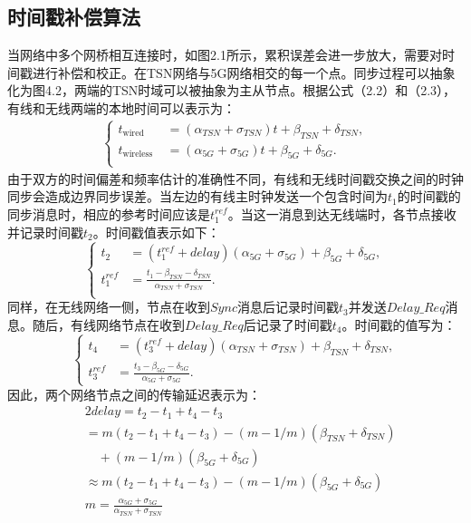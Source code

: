 \documentclass[UTF8,a4paper,12pt]{ctexart}
\numberwithin{equation}{section}
\begin{document}
	\subsection{时间戳补偿算法}
	当网络中多个网桥相互连接时，如图2.1所示，累积误差会进一步放大，需要对时间戳进行补偿和校正。在TSN网络与5G网络相交的每一个点。同步过程可以抽象化为图4.2，两端的TSN时域可以被抽象为主从节点。根据公式（2.2）和（2.3），有线和无线两端的本地时间可以表示为：
	\begin{eqnarray}
		\left\{
		\begin{aligned}
			t_{\text {wired}}&=\left(\alpha_{TSN}+\sigma_{TSN}\right) t+\beta_{TSN}+\delta_{TSN},\\
			t_{\text {wireless }}&=\left(\alpha_{5G}+\sigma_{5G}\right) t+\beta_{5G}+\delta_{5G}.\\
		\end{aligned}
		\right.
	\end{eqnarray}
	由于双方的时间偏差和频率估计的准确性不同，有线和无线时间戳交换之间的时钟同步会造成边界同步误差。当左边的有线主时钟发送一个包含时间为$t_1$的时间戳的同步消息时，相应的参考时间应该是$t_1^{ref}$。当这一消息到达无线端时，各节点接收并记录时间戳$t_2$。时间戳值表示如下：
	\begin{equation}
		\left\{
		\begin{aligned}
			t_{2}&=(t_1^{ref}+delay)(\alpha_{5G}+\sigma_{5G})+\beta_{5G}+\delta_{5G},\\
			t_1^{ref}&=\frac{t_{1}-\beta_{TSN}-\delta_{TSN}}{\alpha_{TSN}+\sigma_{TSN}}.\\
		\end{aligned}
		\right.	
	\end{equation}
	同样，在无线网络一侧，节点在收到$Sync$消息后记录时间戳$t_3$并发送$Delay\_Req$消息。随后，有线网络节点在收到$Delay\_Req$后记录了时间戳$t_4$。时间戳的值写为：
	\begin{equation}
		\left\{
		\begin{aligned}
			t_{4}&=(t_3^{ref}+delay)(\alpha_{TSN}+\sigma_{TSN})+\beta_{TSN}+\delta_{TSN},\\
			t_3^{ref}&=\frac{t_{3}-\beta_{5G}-\delta_{5G}}{\alpha_{5G}+\sigma_{5G}}.
		\end{aligned}
		\right.	
	\end{equation}
	因此，两个网络节点之间的传输延迟表示为：
	\begin{equation}
		\begin{split}
			&2  delay =t_{2}-t_{1}+t_{4}-t_{3} \\
			&=m\left(t_{2}-t_{1}+t_{4}-t_{3}\right)-(m-1 / m)\left(\beta_{TSN}+\delta_{TSN}\right)\\
			&\quad+(m-1 / m)\left(\beta_{5G}+\delta_{5G}\right)\\
			& \approx m\left(t_{2}-t_{1}+t_{4}-t_{3}\right)-(m-1 / m)\left(\beta_{5G}+\delta_{5G}\right)\\
			&m=\frac{\alpha_{5G}+\sigma_{5G}}{\alpha_{TSN}+\sigma_{TSN}}		
		\end{split}
	\end{equation}
\end{document}
